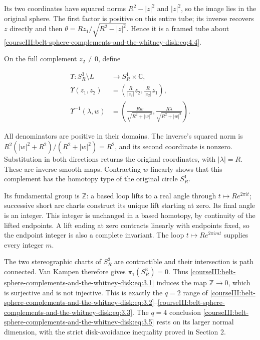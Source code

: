 Its two coordinates have squared norms \(R^2-|z|^2\) and \(|z|^2\), so the image lies in the original sphere. The first factor is positive on this entire tube; its inverse recovers \(z\) directly and then \(\theta=Rz_1/\sqrt{R^2-|z|^2}\). Hence it is a framed tube about \eqref{courseIII:belt-sphere-complements-and-the-whitney-disk:eq:4.4}.

On the full complement \(z_2\ne0\), define

\begin{equation}
\begin{aligned}
\Upsilon:S_R^3\setminus L&\longrightarrow S_R^1\times\mathbb C,\\
\Upsilon(z_1,z_2)&=
\left(\frac R{|z_2|}z_2,\frac R{|z_2|}z_1\right),\\
\Upsilon^{-1}(\lambda,w)&=
\left(\frac{Rw}{\sqrt{R^2+|w|^2}},
\frac{R\lambda}{\sqrt{R^2+|w|^2}}\right).
\end{aligned}
\label{courseIII:belt-sphere-complements-and-the-whitney-disk:eq:4.6}
\end{equation}

All denominators are positive in their domains. The inverse's squared norm is
\(R^2(|w|^2+R^2)/(R^2+|w|^2)=R^2\), and its second coordinate is nonzero. Substitution in both directions returns the original coordinates, with \(|\lambda|=R\). These are inverse smooth maps. Contracting \(w\) linearly shows that this complement has the homotopy type of the original circle \(S_R^1\).

Its fundamental group is \(\mathbb Z\): a based loop lifts to a real angle through \(t\mapsto R e^{2\pi it}\); successive short arc charts construct its unique lift starting at zero. Its final angle is an integer. This integer is unchanged in a based homotopy, by continuity of the lifted endpoints. A lift ending at zero contracts linearly with endpoints fixed, so the endpoint integer is also a complete invariant. The loop \(t\mapsto R e^{2\pi imt}\) supplies every integer \(m\).

The two stereographic charts of \(S_R^3\) are contractible and their intersection is path connected. Van Kampen therefore gives \(\pi_1(S_R^3)=0\). Thus \eqref{courseIII:belt-sphere-complements-and-the-whitney-disk:eq:3.1} induces the map \(\mathbb Z\to0\), which is surjective and is not injective. This is exactly the \(q=2\) range of \eqref{courseIII:belt-sphere-complements-and-the-whitney-disk:eq:3.2}--\eqref{courseIII:belt-sphere-complements-and-the-whitney-disk:eq:3.3}. The \(q=4\) conclusion \eqref{courseIII:belt-sphere-complements-and-the-whitney-disk:eq:3.5} rests on its larger normal dimension, with the strict disk-avoidance inequality proved in Section 2.

